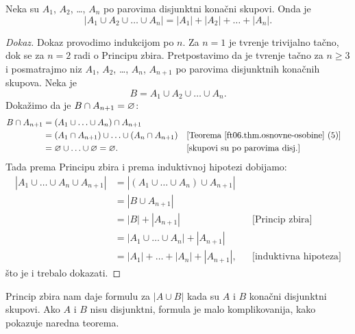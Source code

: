 \begin{THM}
  Neka su $A_1$, $A_2$, \ldots, $A_n$ po parovima disjunktni kona\v cni skupovi. Onda je
  $$
    |A_1 \cup A_2 \cup \ldots \cup A_n| = |A_1| + |A_2| + \ldots + |A_n|.
  $$
\end{THM}
\begin{proof}[Dokaz]
  Dokaz provodimo indukcijom po $n$. Za $n = 1$ je tvr\dj enje trivijalno ta\v cno, dok se za $n = 2$ radi o Principu zbira.
  Pretpostavimo da je tvr\dj enje ta\v cno za $n \ge 3$ i posmatrajmo niz
  $A_1$, $A_2$, \ldots, $A_n$, $A_{n+1}$ po parovima disjunktnih kona\v cnih skupova. Neka je
  $$
    B = A_1 \cup A_2 \cup \ldots \cup A_n.
  $$
  Doka\v zimo da je $B \cap A_{n+1} = \varnothing$:
  \begin{align*}
    B \cap A_{n+1}
    &= (A_1 \cup \ldots \cup A_n) \cap A_{n+1}\\
    &= (A_1 \cap A_{n+1}) \cup \ldots \cup (A_n \cap A_{n+1}) && \text{[Teorema~\ref{ft06.thm.osnovne-osobine} (5)]}\\
    &= \varnothing \cup \ldots \cup \varnothing = \varnothing. && \text{[skupovi su po parovima disj.]}
  \end{align*}
  Tada prema Principu zbira i prema induktivnoj hipotezi dobijamo:
  \begin{align*}
    |A_1 \cup \ldots \cup A_n \cup A_{n+1}|
    &= |(A_1 \cup \ldots \cup A_n) \cup A_{n+1}| \\
    &= |B \cup A_{n+1}| \\
    &= |B| + |A_{n+1}| && \text{[Princip zbira]}\\
    &= |A_1 \cup \ldots \cup A_n| + |A_{n+1}| \\
    &= |A_1| + \ldots + |A_n| + |A_{n+1}|, && \text{[induktivna hipoteza]}
  \end{align*}
  \v sto je i trebalo dokazati.
\end{proof}

Princip zbira nam daje formulu za $|A \cup B|$ kada su $A$ i $B$ kona\v cni disjunktni skupovi. Ako $A$ i $B$ nisu
disjunktni, formula je malo komplikovanija, kako pokazuje naredna teorema.

